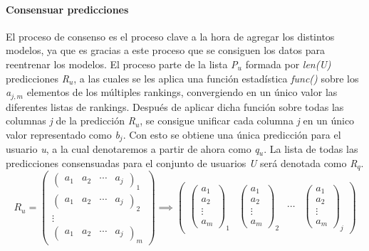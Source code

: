 \paragraph{Consensuar predicciones} \label{Consensuar_predicciones} El proceso de consenso es el proceso clave a la hora de agregar los distintos modelos, ya que es gracias a este proceso que se consiguen los datos para reentrenar los modelos. El proceso parte de la lista \textit{P$_{u}$} formada por \textit{len(U)} predicciones \textit{R$_{u}$}, a las cuales se les aplica una función estadística \textit{func()} sobre los \textit{a$_{j, m}$} elementos de los múltiples rankings, convergiendo en un único valor las diferentes listas de rankings. Después de aplicar dicha función sobre todas las columnas \textit{j} de la predicción \textit{R$_{u}$}, se consigue unificar cada columna \textit{j} en un único valor representado como \textit{b$_{j}$}. Con esto se obtiene una única predicción para el usuario \textit{u}, a la cual denotaremos a partir de ahora como \textit{q$_{u}$}. La lista de todas las predicciones consensuadas para el conjunto de usuarios \textit{U} será denotada como \textit{R$_{q}$}.
\[  \textit{R$_{u}$}=
    \begin{pmatrix}
        \begin{pmatrix} a_{1}  &  a_{2}  &  \cdots   & a_{j} \end{pmatrix}_{1} \\ 
        \begin{pmatrix} a_{1}  &  a_{2}  &  \cdots   & a_{j} \end{pmatrix}_{2} \\ 
        \vdots \\ 
        \begin{pmatrix} a_{1}  &  a_{2}  &  \cdots   & a_{j} \end{pmatrix}_{m}
    \end{pmatrix}
    \implies
    \begin{pmatrix}
        \begin{pmatrix} a_{1}  \\  a_{2}  \\  \vdots   \\ a_{m} \end{pmatrix}_{1} & 
        \begin{pmatrix} a_{1}  \\  a_{2}  \\  \vdots   \\ a_{m} \end{pmatrix}_{2} & 
        \cdots &
        \begin{pmatrix} a_{1}  \\  a_{2}  \\  \vdots   \\ a_{m} \end{pmatrix}_{j}
    \end{pmatrix}    
\]
